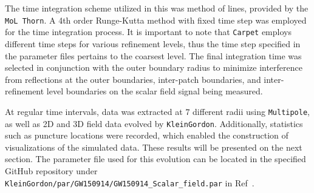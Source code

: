 
The time integration scheme utilized in this was method of lines, provided by the \texttt{MoL Thorn}. A 4th order Runge-Kutta method with fixed time step was employed for the time integration process. It is important to note that \texttt{Carpet} employs different time steps for various refinement levels, thus the time step specified in the parameter files pertains to the coarsest level. The final integration time was selected in conjunction with the outer boundary radius to minimize interference from reflections at the outer boundaries, inter-patch boundaries, and inter-refinement level boundaries on the scalar field signal being measured.

At regular time intervals, data was extracted at $7$ different radii using \texttt{Multipole}, as well as 2D and 3D field data evolved by \texttt{KleinGordon}. Additionally, statistics such as puncture locations were recorded, which enabled the construction of visualizations of the simulated data. These results will be presented on the next section. The parameter file used for this evolution can be located in the specified GitHub repository under \texttt{KleinGordon/par/GW150914/GW150914\_Scalar\_field.par} in Ref~\cite{FieldPerturbationsRepo}.